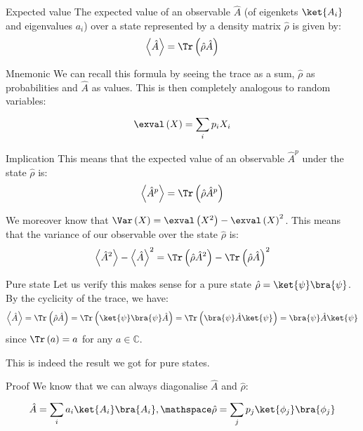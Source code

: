 \documentclass[a4paper]{article}
\begin{document}
\begin{parag}{Expected value}
    The expected value of an observable $\hat{A}$ (of eigenkets $\ket{A_i}$ and eigenvalues $a_i$) over a state represented by a density matrix $\hat{\rho}$ is given by: 
    \[\left\langle \hat{A} \right\rangle = \Tr\left(\hat{\rho} \hat{A}\right)\]

    \begin{subparag}{Mnemonic}
        We can recall this formula by seeing the trace as a sum, $\hat{\rho}$ as probabilities and $\hat{A}$ as values. This is then completely analogous to random variables: 
        \[\exval\left(X\right) = \sum_{i}^{} p_i X_i\]
    \end{subparag}

    \begin{subparag}{Implication}
        This means that the expected value of an observable $\hat{A}^p$ under the state $\hat{\rho}$ is: 
        \[\left\langle \hat{A}^p \right\rangle = \Tr\left(\hat{\rho} \hat{A}^p\right)\]

        We moreover know that $\Var\left(X\right) = \exval\left(X^2\right) - \exval\left(X\right)^2$. This means that the variance of our observable over the state $\hat{\rho}$ is: 
        \[\left\langle \hat{A}^2 \right\rangle - \left\langle \hat{A} \right\rangle^2 = \Tr\left(\hat{\rho} \hat{A}^2\right) - \Tr\left(\hat{\rho} \hat{A}\right)^2\]
    \end{subparag}
    
    \begin{subparag}{Pure state}
        Let us verify this makes sense for a pure state $\hat{\rho} = \ket{\psi}\bra{\psi}$. By the cyclicity of the trace, we have: 
        \[\left\langle \hat{A} \right\rangle = \Tr\left(\hat{\rho} \hat{A}\right) = \Tr\left(\ket{\psi} \bra{\psi} \hat{A}\right) = \Tr\left(\bra{\psi}\hat{A} \ket{\psi}\right) = \bra{\psi}\hat{A} \ket{\psi}\]
        since $\Tr\left(a\right) = a$ for any $a \in \mathbb{C}$.

        This is indeed the result we got for pure states.
    \end{subparag}

    \begin{subparag}{Proof}
        We know that we can always diagonalise $\hat{A}$ and $\hat{\rho}$: 
        \[\hat{A} = \sum_{i}^{} a_i \ket{A_i}\bra{A_i}, \mathspace \hat{\rho} = \sum_{j}^{} p_j \ket{\phi_j} \bra{\phi_j}\]
        

\end{subparag}
\end{parag}
\end{document}

